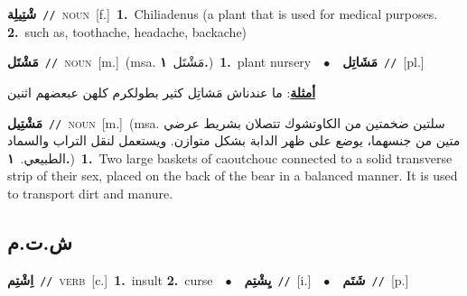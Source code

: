 \documentclass[10pt,a4paper,twoside]{article} %
\begin{document}
\begin{multicols}{2}
{{{{{{{{{{{{{{\setlength\topsep{0pt}\textbf{\foreignlanguage{arabic}{شْتِيلِة}}\ {\color{gray}\texttt{//}\color{black}}\ \textsc{noun}\ [f.]\ \textbf{1.}~Chiliadenus (a plant that is used for medical purposes.  \textbf{2.}~such as, toothache, headache, backache)\ 

{\setlength\topsep{0pt}\textbf{\foreignlanguage{arabic}{مَشْتَل}}\ {\color{gray}\texttt{//}\color{black}}\ \textsc{noun}\ [m.]\ \color{gray}(msa. \foreignlanguage{arabic}{مَشْتَل}~\foreignlanguage{arabic}{\textbf{١.}})\color{black}\ \textbf{1.}~plant nursery\ \ $\bullet$\ \ \setlength\topsep{0pt}\textbf{\foreignlanguage{arabic}{مَشَاتِل}}\ {\color{gray}\texttt{//}\color{black}}\ [pl.]\  \begin{flushright}\color{gray}\foreignlanguage{arabic}{\textbf{\underline{\foreignlanguage{arabic}{أمثلة}}}: ما عندناش مَشاتِل كثير بطولكرم كلهن عبعضهم اثنين}\end{flushright}\color{black}} \vspace{2mm}

{\setlength\topsep{0pt}\textbf{\foreignlanguage{arabic}{مَشْتِيل}}\ {\color{gray}\texttt{//}\color{black}}\ \textsc{noun}\ [m.]\ \color{gray}(msa. \foreignlanguage{arabic}{سلتين ضخمتين من الكاوتشوك تتصلان بشريط عرضي متين من جنسهما، يوضع على ظهر الدابة بشكل متوازن. ويستعمل لنقل التراب والسماد الطبيعي.}~\foreignlanguage{arabic}{\textbf{١.}})\color{black}\ \textbf{1.}~Two large baskets of caoutchouc connected to a solid transverse strip of their sex, placed on the back of the bear in a balanced manner. It is used to transport dirt and manure.\ 

\vspace{-3mm}
\subsection*{\color{blue}\foreignlanguage{arabic}{ش.ت.م}\color{blue}{}} 

{\setlength\topsep{0pt}\textbf{\foreignlanguage{arabic}{اِشْتِم}}\ {\color{gray}\texttt{//}\color{black}}\ \textsc{verb}\ [c.]\ \textbf{1.}~insult  \textbf{2.}~curse\ \ $\bullet$\ \ \setlength\topsep{0pt}\textbf{\foreignlanguage{arabic}{يِشْتِم}}\ {\color{gray}\texttt{//}\color{black}}\ [i.]\ \ $\bullet$\ \ \setlength\topsep{0pt}\textbf{\foreignlanguage{arabic}{شَتَم}}\ {\color{gray}\texttt{//}\color{black}}\ [p.]\ 

}}}}}}}}}}}}}}}}
\end{multicols}
\end{document}
